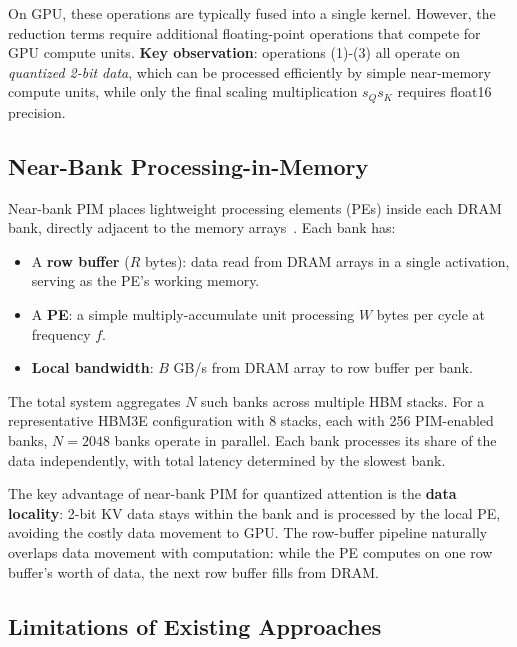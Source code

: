 On GPU, these operations are typically fused into a single kernel.
However, the reduction terms require additional floating-point operations that compete for GPU compute units.
\textbf{Key observation}: operations (1)-(3) all operate on \emph{quantized 2-bit data}, which can be processed efficiently by simple near-memory compute units, while only the final scaling multiplication $s_Q s_K$ requires float16 precision.

\subsection{Near-Bank Processing-in-Memory}

Near-bank PIM places lightweight processing elements (PEs) inside each DRAM bank, directly adjacent to the memory arrays~\citep{seshadri2017ambit,mutlu2020processing}.
Each bank has:
\begin{itemize}
\item A \textbf{row buffer} ($R$ bytes): data read from DRAM arrays in a single activation, serving as the PE's working memory.
\item A \textbf{PE}: a simple multiply-accumulate unit processing $W$ bytes per cycle at frequency $f$.
\item \textbf{Local bandwidth}: $B$ GB/s from DRAM array to row buffer per bank.
\end{itemize}


The total system aggregates $N$ such banks across multiple HBM stacks.
For a representative HBM3E configuration with 8 stacks, each with 256 PIM-enabled banks, $N = 2048$ banks operate in parallel.
Each bank processes its share of the data independently, with total latency determined by the slowest bank.

The key advantage of near-bank PIM for quantized attention is the \textbf{data locality}: 2-bit KV data stays within the bank and is processed by the local PE, avoiding the costly data movement to GPU.
The row-buffer pipeline naturally overlaps data movement with computation: while the PE computes on one row buffer's worth of data, the next row buffer fills from DRAM.

\subsection{Limitations of Existing Approaches}

